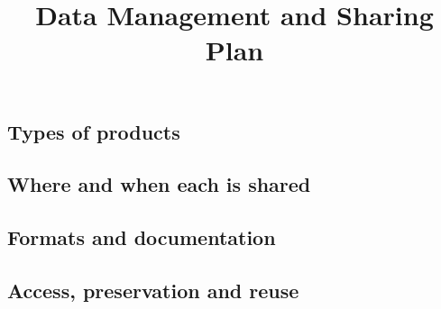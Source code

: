 \documentclass[11pt]{amsart}
\title{Data Management and Sharing Plan}
\begin{document}
\maketitle
\vspace{-0.9cm}

\subsection*{Types of products}

\subsection*{Where and when each is shared}

\subsection*{Formats and documentation}

\subsection*{Access, preservation and reuse}
\end{document}
